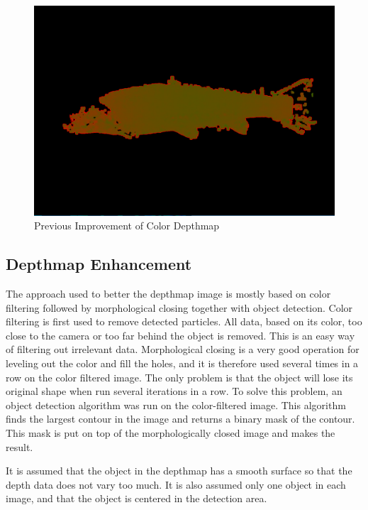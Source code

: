 \begin{figure}[H]
    \centering
    \includegraphics[width=.9\linewidth]{images/implementation/sealab_fish1}
    \caption{Previous Improvement of Color Depthmap}
    \label{fig:sealab_implementation}
\end{figure}




\subsection{Depthmap Enhancement} \label{section:depthmap}

The approach used to better the depthmap image is mostly based on color filtering followed by morphological closing together with object detection. 
Color filtering is first used to remove detected particles. All data, based on its color, too close to the camera or too far behind the object is removed. This is an easy way of filtering out irrelevant data. Morphological closing is a very good operation for leveling out the color and fill the holes, and it is therefore used several times in a row on the color filtered image. The only problem is that the object will lose its original shape when run several iterations in a row. To solve this problem, an object detection algorithm was run on the color-filtered image. This algorithm finds the largest contour in the image and returns a binary mask of the contour. This mask is put on top of the morphologically closed image and makes the result.

It is assumed that the object in the depthmap has a smooth surface so that the depth data does not vary too much. It is also assumed only one object in each image, and that the object is centered in the detection area.

